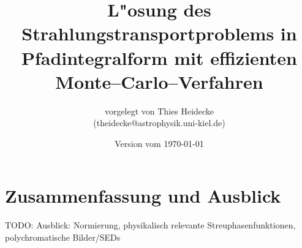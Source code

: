 \documentclass[
	12pt,
	a4paper,
	DIVcalc,
	titlepage,
	twoside,
	liststotoc,
	bibtotocnumbered,
	final%
]{scrbook}
\begin{document}
\frontmatter
	\titlehead{Christian--Albrechts--Universit"at zu Kiel\\ Institut f"ur Theoretische Physik und Astrophysik}
	\subject{Diplomarbeit}
	\title{L"osung des Strahlungstransportproblems in Pfadintegralform mit effizienten Monte--Carlo--Verfahren}
	\author{vorgelegt von Thies Heidecke\\(theidecke@astrophysik.uni-kiel.de)}
	\publishers{betreut durch Prof. Dr. Sebastian Wolf}
	\date{Version vom \today}
	\maketitle

	\tableofcontents	%

	\newcommand{\location}[1]{\mathbf{#1}}
	\newcommand{\scatter}[1]{\overset{#1}{\leftrightsquigarrow}}
	\newcommand{\normalized}[1]{\frac{#1}{||#1||}}
	\newcommand{\pirate}{\texttt{PIRaTE} }
	\newcommand{\mctd}{\texttt{MC3D} }

\mainmatter
	
	
	
	
	
	
		
	
	\chapter{Zusammenfassung und Ausblick}
	TODO: Ausblick: Normierung, physikalisch relevante Streuphasenfunktionen, polychromatische Bilder/SEDs

\backmatter
	
	
\end{document}
